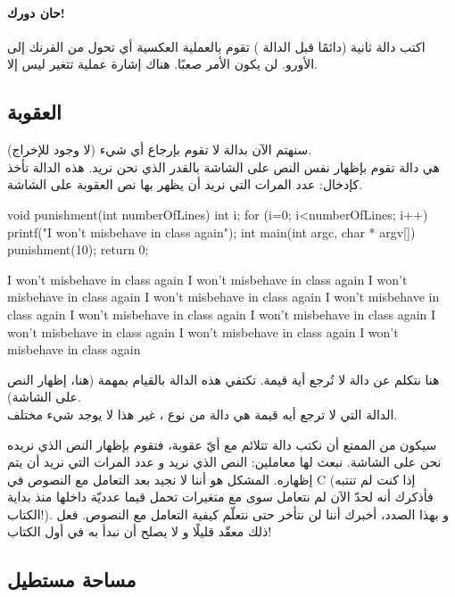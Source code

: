 \paragraph{حان دورك!}
اكتب دالة ثانية (دائمًا قبل الدالة 
)
تقوم بالعملية العكسية أي تحول من الفرنك إلى الأورو. لن يكون الأمر صعبًا. هناك إشارة عملية تتغير ليس إلا.

\subsection{العقوبة}

سنهتم الآن بدالة لا تقوم بإرجاع أي شيء (لا وجود للإخراج).\\
هي دالة تقوم بإظهار نفس النص على الشاشة بالقدر الذي نحن نريد. هذه الدالة تأخذ كإدخال: عدد المرات التي نريد أن يظهر بها نص العقوبة على الشاشة.

\begin{Csource}
void punishment(int numberOfLines)
{
	int i;
	for (i=0; i<numberOfLines; i++){
		printf("I won't misbehave in class again\n");
	}
}
int main(int argc, char * argv[])
{
	punishment(10);
	return 0;
}
\end{Csource}

\begin{Console}
I won't misbehave in class again
I won't misbehave in class again
I won't misbehave in class again
I won't misbehave in class again
I won't misbehave in class again
I won't misbehave in class again
I won't misbehave in class again
I won't misbehave in class again
I won't misbehave in class again
I won't misbehave in class again
\end{Console}

هنا نتكلم عن دالة لا تُرجع أية قيمة. تكتفي هذه الدالة بالقيام بمهمة (هنا، إظهار النص على الشاشة).\\
الدالة التي لا ترجع أيه قيمة هي دالة من نوع 
،
غير هذا لا يوجد شيء مختلف.

سيكون من الممتع أن نكتب دالة 
تتلائم مع أيّ عقوبة، فتقوم بإظهار النص الذي نريده نحن على الشاشة. نبعث لها معاملين: النص الذي نريد و عدد المرات التي نريد أن يتم إظهاره. المشكل هو أننا لا نجيد بعد التعامل مع النصوص في \textenglish{C}
(إذا كنت لم تنتبه فأذكرك أنه لحدّ الآن لم نتعامل سوى مع متغيرات تحمل قيما عدديّة داخلها منذ بداية الكتاب!). و بهذا الصدد، أخبرك أننا لن نتأخر حتى نتعلّم كيفية التعامل مع النصوص. فعل ذلك معقّد قليلًا و لا يصلح أن نبدأ به في أول الكتاب!

\subsection{مساحة مستطيل}

